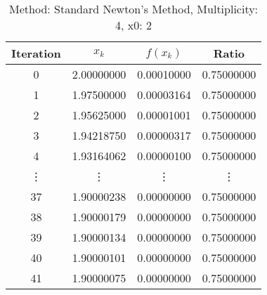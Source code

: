 \begin{table}
\centering
\caption{Method: Standard Newton's Method, Multiplicity: 4, x0: 2}
\label{tab:table_Standard_Newton's_Method_4_2}
\begin{tabular}{c c c c}
\toprule
Iteration &      $x_k$ &   $f(x_k)$ &      Ratio \\
\midrule
        0 & 2.00000000 & 0.00010000 & 0.75000000 \\
        1 & 1.97500000 & 0.00003164 & 0.75000000 \\
        2 & 1.95625000 & 0.00001001 & 0.75000000 \\
        3 & 1.94218750 & 0.00000317 & 0.75000000 \\
        4 & 1.93164062 & 0.00000100 & 0.75000000 \\
   \vdots &     \vdots &     \vdots &     \vdots \\
       37 & 1.90000238 & 0.00000000 & 0.75000000 \\
       38 & 1.90000179 & 0.00000000 & 0.75000000 \\
       39 & 1.90000134 & 0.00000000 & 0.75000000 \\
       40 & 1.90000101 & 0.00000000 & 0.75000000 \\
       41 & 1.90000075 & 0.00000000 & 0.75000000 \\
\bottomrule
\end{tabular}
\end{table}
